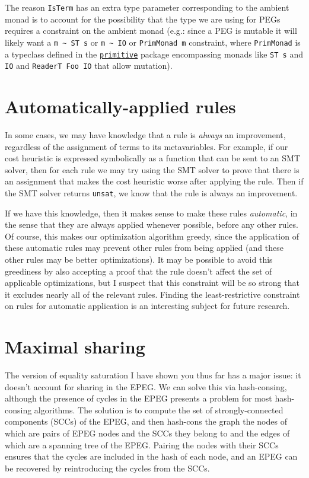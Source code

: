 \documentclass[11pt]{report}
\newcommand{\haskell}[1]{\texttt{#1}}
\begin{document}
The reason \haskell{IsTerm} has an extra type parameter corresponding to the
ambient monad is to account for the possibility that the type we are using
for PEGs requires a constraint on the ambient monad (e.g.: since a PEG is
mutable it will likely want a \texttt{m \textasciitilde{} \haskell{ST} s} or
\texttt{m \textasciitilde{} \haskell{IO}} or \haskell{PrimMonad m} constraint,
where \haskell{PrimMonad} is a typeclass defined in the
\href{https://hackage.haskell.org/package/primitive-0.6.3.0/docs/Control-Monad-Primitive.html#t:PrimMonad}{\texttt{primitive}}
package encompassing monads like \haskell{ST s} and \haskell{IO}
and \haskell{ReaderT Foo IO} that allow mutation).

\section{Automatically-applied rules}
\label{sec:automatic-rules}

In some cases, we may have knowledge that a rule is \textit{always} an
improvement, regardless of the assignment of terms to its metavariables.
For example, if our cost heuristic is expressed symbolically as a function
that can be sent to an SMT solver, then for each rule we may try using the
SMT solver to prove that there is an assignment that makes the cost heuristic
worse after applying the rule. Then if the SMT solver returns \texttt{unsat},
we know that the rule is always an improvement.

If we have this knowledge, then it makes sense to make these rules
\textit{automatic}, in the sense that they are always applied whenever possible,
before any other rules. Of course, this makes our optimization algorithm greedy,
since the application of these automatic rules may prevent other rules from
being applied (and these other rules may be better optimizations). It may be
possible to avoid this greediness by also accepting a proof that the rule
doesn't affect the set of applicable optimizations, but I suspect that this
constraint will be so strong that it excludes nearly all of the relevant rules.
Finding the least-restrictive constraint on rules for automatic application is
an interesting subject for future research.

\section{Maximal sharing}
\label{sec:msharing}

The version of equality saturation I have shown you thus far has a major issue:
it doesn't account for sharing in the EPEG. We can solve this via hash-consing,
although the presence of cycles in the EPEG presents a problem for most
hash-consing algorithms. The solution is to compute the set of
strongly-connected components (SCCs) of the EPEG, and then hash-cons the graph
the nodes of which are pairs of EPEG nodes and the SCCs they belong to and
the edges of which are a spanning tree of the EPEG. Pairing the nodes with their
SCCs ensures that the cycles are included in the hash of each node, and an EPEG
can be recovered by reintroducing the cycles from the SCCs.
\end{document}
